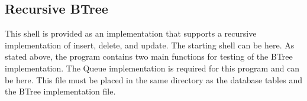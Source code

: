 \documentclass[letterpaper,10pt,english]{sphinxmanual}
\begin{document}
\begin{sphinxVerbatim}[commandchars=\\\{\},numbers=left,firstnumber=1,stepnumber=1]
      
        
            
     \PYGZbs{}
    
   
\end{sphinxVerbatim}


\subsection{Recursive B\sphinxhyphen{}Tree}
\label{\detokenize{chap10/chap10:recursive-b-tree}}
This shell is provided as an implementation that supports a recursive implementation of insert, delete, and update. The starting shell can be  here. As stated above, the program contains two main functions for testing of the B\sphinxhyphen{}Tree implementation. The Queue implementation is required for this program and can be  here. This file must be placed in the same directory as the database tables and the B\sphinxhyphen{}Tree implementation file.
\end{document}
